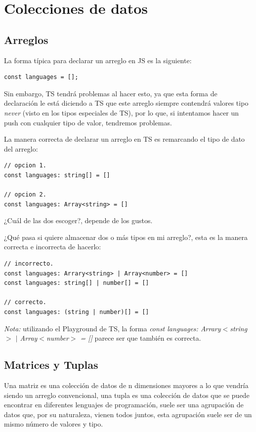 \section{Colecciones de datos}


\subsection{Arreglos}

La forma típica para declarar un arreglo en JS es la siguiente:
\begin{lstlisting}
const languages = [];
\end{lstlisting}

Sin embargo, TS tendrá problemas al hacer esto, ya que esta forma de declaración le está diciendo a TS que este arreglo siempre contendrá valores tipo \textit{never} (visto en los tipos especiales de TS), por lo que, si intentamos hacer un push con cualquier tipo de valor, tendremos problemas.

La manera correcta de declarar un arreglo en TS es remarcando el tipo de dato del arreglo:
\begin{lstlisting}
// opcion 1.
const languages: string[] = []

// opcion 2.
const languages: Array<string> = []
\end{lstlisting}

¿Cuál de las dos escoger?, depende de los gustos.

¿Qué pasa si quiere almacenar dos o más tipos en mi arreglo?, esta es la manera correcta e incorrecta de hacerlo:
\begin{lstlisting}
// incorrecto.
const languages: Arrary<string> | Array<number> = []
const languages: string[] | number[] = []

// correcto.
const languages: (string | number)[] = []
\end{lstlisting}

\textit{Nota:} utilizando el Playground de TS, la forma \textit{const languages: Arrary$<$string$>$ $|$ Array$<$number$>$ = []} parece ser que también es correcta.


\subsection{Matrices y Tuplas}

Una matriz es una colección de datos de n dimensiones mayores a lo que vendría siendo un arreglo convencional, una tupla es una colección de datos que se puede encontrar en diferentes lenguajes de programación, suele ser una agrupación de datos que, por su naturaleza, vienen todos juntos, esta agrupación suele ser de un mismo número de valores y tipo.

